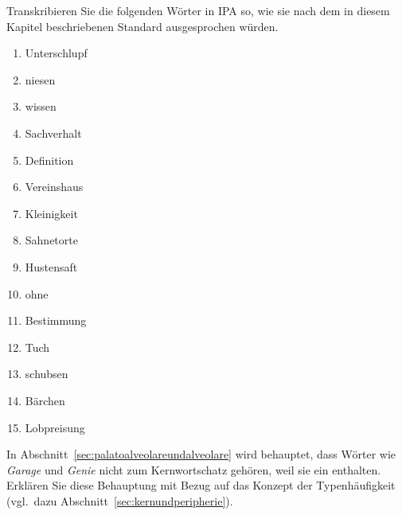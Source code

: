  \label{exc:phonetik03} Transkribieren Sie die folgenden Wörter in IPA so, wie sie nach dem in diesem Kapitel beschriebenen Standard ausgesprochen würden.

\begin{enumerate}
  \item Unterschlupf
  \item niesen
  \item wissen
  \item Sachverhalt
  \item Definition
  \item Vereinshaus
  \item Kleinigkeit
  \item Sahnetorte
  \item Hustensaft
  \item ohne
  \item Bestimmung
  \item Tuch
  \item schubsen
  \item Bärchen
  \item Lobpreisung
\end{enumerate}

\Uebung[\tristar]{} \label{exc:phonetik04} In Abschnitt~\ref{sec:palatoalveolareundalveolare} wird behauptet, dass Wörter wie \textit{Garage} und \textit{Genie} nicht zum Kernwortschatz gehören, weil sie ein \textipa{[Z]} enthalten.
Erklären Sie diese Behauptung mit Bezug auf das Konzept der Typenhäufigkeit (vgl.\ dazu Abschnitt~\ref{sec:kernundperipherie}).
